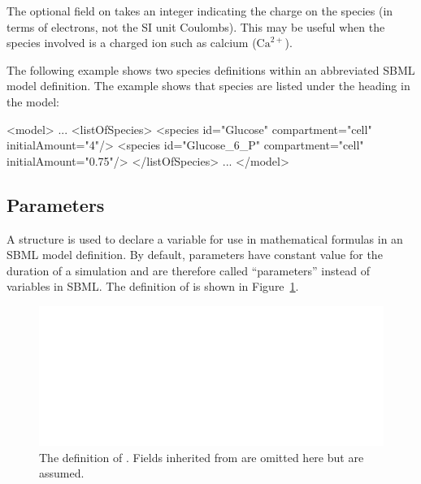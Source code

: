 \documentclass[10pt,twocolumntoc]{cekarticle}
\newcommand{\vref}[1]{\ref{#1}}
\begin{document}
The optional field  on  takes an integer
indicating the charge on the species (in terms of electrons, not the SI
unit Coulombs). This may be useful when the species involved is a charged
ion such as calcium ($\text{Ca}^{2+}$).

The following example shows two species definitions within an
abbreviated SBML model definition.  The example shows that species
are listed under the heading  in the model:

\begin{example}
<model>
    ...
    <listOfSpecies>
        <species id="Glucose" compartment="cell" initialAmount="4"/>
        <species id="Glucose_6_P" compartment="cell" initialAmount="0.75"/>
    </listOfSpecies>
    ...
</model>

\end{example}

\subsection{Parameters}
\label{sec:parameters}

A  structure is used to declare a variable for use in
mathematical formulas in an SBML model definition.  By default, parameters
have constant value for the duration of a simulation and are therefore
called ``parameters'' instead of variables in SBML.  The definition of
 is shown in Figure~\vref{fig:parameter}.

\begin{figure}[htb]
  \vspace*{8pt}
  \centering
  \includegraphics[scale = 0.68]{parameter}
  \caption{The definition of .   Fields inherited from
     are omitted here but are assumed.}
  \label{fig:parameter}
\end{figure}
\end{document}

